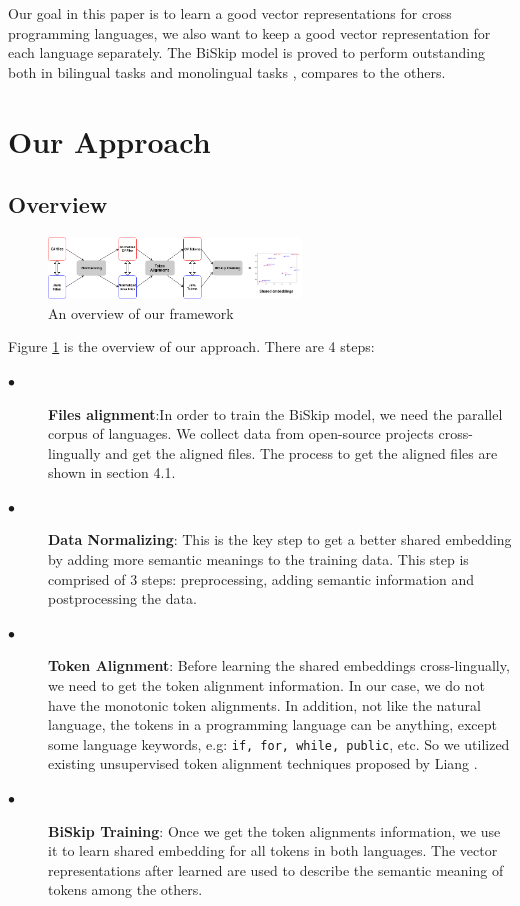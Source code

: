 Our goal in this paper is to learn a good vector representations for cross programming languages, we also want to keep a good vector representation for each language separately. The BiSkip model is proved to perform outstanding both in bilingual tasks and monolingual tasks \cite{luong2015bilingual}, compares to the others.

\section{Our Approach}
\subsection{Overview}

\begin{figure}[t!]
	\includegraphics[width=0.60\textwidth]{approach}
	\caption{An overview of our framework}
	\label{fig:approach}
\end{figure}



Figure \ref{fig:approach} is the overview of our approach. There are 4 steps:
\begin{description}
	\item [$\bullet$] \textbf{Files alignment}:In order to train the BiSkip model, we need the parallel corpus of languages. We collect data from open-source projects cross-lingually and get the aligned files. The process to get the aligned files are shown in section 4.1.
	\item [$\bullet$]\textbf{Data Normalizing}: This is the key step to get a better shared embedding by adding more semantic meanings to the training data. This step is comprised of 3 steps: preprocessing, adding semantic information and postprocessing the data.
	\item [$\bullet$] \textbf{Token Alignment}: Before learning the shared embeddings cross-lingually, we need to get the token alignment information. In our case, we do not have the monotonic token alignments. In addition, not like the natural language, the tokens in a programming language can be anything, except some language keywords, e.g: \texttt{if, for, while, public}, etc. So we utilized existing unsupervised token alignment techniques proposed by Liang \cite{liang2006alignment}.
	\item [$\bullet$] \textbf{BiSkip Training}: Once we get the token alignments information, we use it to learn shared embedding for all tokens in both languages. The vector representations after learned are used to describe the semantic meaning of tokens among the others.
	
	
\end{description}




